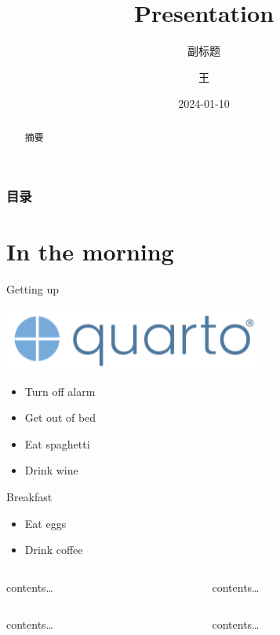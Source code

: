 \documentclass[
  28,
  ignorenonframetext,
  aspectratio=169,
]{beamer}
\title{Presentation}
\subtitle{副标题}
\author{王}
\date{2024-01-10}
\institute{TDLI}
\providecommand{\tightlist}{%
  \setlength{\itemsep}{0pt}\setlength{\parskip}{0pt}}\usepackage{longtable,booktabs,array}
\renewcommand*\contentsname{目录}
\newcommand\contentsname{目录}
\begin{document}
\frame{\titlepage}
\begin{abstract}
摘要
\end{abstract}

\renewcommand*\contentsname{目录}
\begin{frame}[allowframebreaks]
  \frametitle{目录}
  \tableofcontents[hideallsubsections]
\end{frame}
\section{In the morning}\label{in-the-morning}

\begin{frame}{Getting up}
\label{getting-up}
\begin{center}
\includegraphics{test2_files/mediabag/quarto.png}
\end{center}

\begin{itemize}[<+->]
\tightlist
\item
  Turn off alarm
\item
  Get out of bed
\end{itemize}

\begin{itemize}[<+->]
\tightlist
\item
  Eat spaghetti
\item
  Drink wine
\end{itemize}
\end{frame}

\begin{frame}{Breakfast}
\label{breakfast}
\begin{itemize}[<+->]
\tightlist
\item
  Eat eggs
\item
  Drink coffee
\end{itemize}

\begin{columns}[T]
\begin{column}{0.4\textwidth}
contents\ldots{}
\end{column}

\begin{column}{0.6\textwidth}
contents\ldots{}
\end{column}
\end{columns}

\begin{columns}[T,onlytextwidth]
\begin{column}[c]{0.4\textwidth}
contents\ldots{}
\end{column}

\begin{column}{0.6\textwidth}
contents\ldots{}
\end{column}
\end{columns}
\end{frame}
\end{document}
